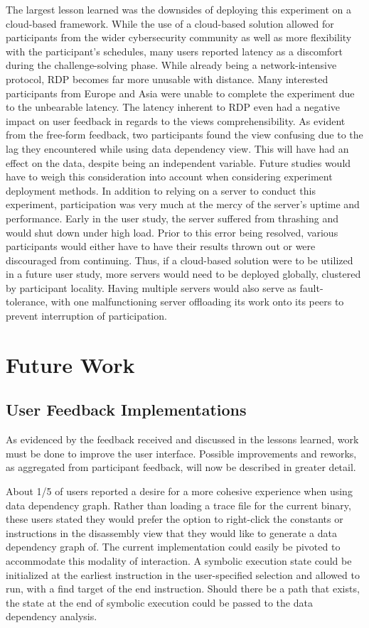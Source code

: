 The largest lesson learned was the downsides of deploying this experiment on a cloud-based framework. While the use of a cloud-based solution allowed for participants from the wider cybersecurity community as well as more flexibility with the participant’s schedules, many users reported latency as a discomfort during the challenge-solving phase. While already being a network-intensive protocol, RDP becomes far more unusable with distance. Many interested participants from Europe and Asia were unable to complete the experiment due to the unbearable latency. The latency inherent to RDP even had a negative impact on user feedback in regards to the views comprehensibility. As evident from the free-form feedback, two participants found the view confusing due to the lag they encountered while using data dependency view. This will have had an effect on the data, despite being an independent variable. Future studies would have to weigh this consideration into account when considering experiment deployment methods.
In addition to relying on a server to conduct this experiment, participation was very much at the mercy of the server’s uptime and performance. Early in the user study, the server suffered from thrashing and would shut down under high load. Prior to this error being resolved, various participants would either have to have their results thrown out or were discouraged from continuing. Thus, if a cloud-based solution were to be utilized in a future user study, more servers would need to be deployed globally, clustered by participant locality. Having multiple servers would also serve as fault-tolerance, with one malfunctioning server offloading its work onto its peers to prevent interruption of participation.

\section{Future Work}
\subsection{User Feedback Implementations}
As evidenced by the feedback received and discussed in the lessons learned, work must be done to improve the user interface. Possible improvements and reworks, as aggregated from participant feedback, will now be described in greater detail. 

About 1/5 of users reported a desire for a more cohesive experience when using data dependency graph. Rather than loading a trace file for the current binary, these users stated they would prefer the option to right-click the constants or instructions in the disassembly view that they would like to generate a data dependency graph of. The current implementation could easily be pivoted to accommodate this modality of interaction. A symbolic execution state could be initialized at the earliest instruction in the user-specified selection and allowed to run, with a find target of the end instruction. Should there be a path that exists, the state at the end of symbolic execution could be passed to the data dependency analysis.

